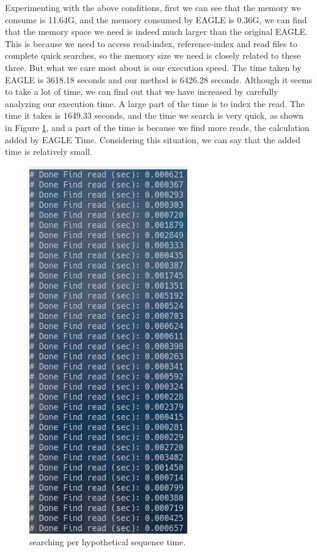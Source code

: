 Experimenting with the above conditions, first we can see that the memory we consume is 11.64G, and the memory consumed by EAGLE is 0.36G, we can find that the memory space we need is indeed much larger than the original EAGLE. This is because we need to access read-index, reference-index and read files to complete quick searches, so the memory size we need is closely related to these three.
But what we care most about is our execution speed. The time taken by EAGLE is 3618.18 seconds and our method is 6426.28 seconds. Although it seems to take a lot of time, we can find out that we have increased by carefully analyzing our execution time. A large part of the time is to index the read. The time it takes is 1649.33 seconds, and the time we search is very quick, as shown in Figure \ref{f4-28}, and a part of the time is because we find more reads, the calculation added by EAGLE Time. Considering this situation, we can say that the added time is relatively small.

\begin{figure}[H]
    \centering
    \includegraphics[width=0.4\columnwidth]{body/image/4-28.png}
    \captionsetup{labelfont=bf}
    \renewcommand{\baselinestretch}{1.0}
    \caption[searching time]{searching per hypothetical sequence time.}
    \label{f4-28}
\end{figure}
